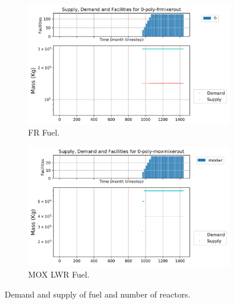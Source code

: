\documentclass[11pt]{article}
\begin{document}
\begin{figure}[H]
	\centering
	\begin{subfigure}[]{0.45\textwidth}
		\centering
		\includegraphics[width=\linewidth]{29-figures/0-poly-frmixerout.png} 
		\caption{FR Fuel.}
		\label{fig:29-frmixerout}
	\end{subfigure}
	\vspace{1cm}
	\begin{subfigure}[]{0.45\textwidth}
		\centering
		\includegraphics[width=\linewidth]{29-figures/0-poly-moxmixerout.png} 
		\caption{MOX LWR Fuel.}
		\label{fig:29-moxmixerout}
	\end{subfigure}
	\hfill
	\caption{Demand and supply of fuel and number of reactors.}
	\label{fig:29-mix}
\end{figure}
\end{document}
